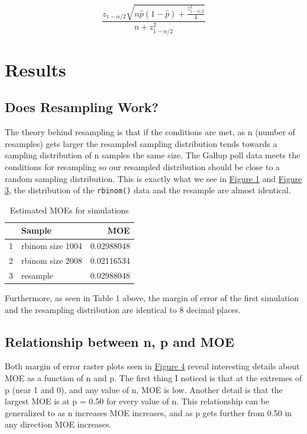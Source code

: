 \documentclass{article}\usepackage[]{graphicx}\usepackage[]{xcolor}
\begin{document}
\begin{multicols}{2}
\[
\frac{z_{1 - \alpha/2} \sqrt{n\hat{p}(1 - \hat{p}) + \frac{z_{1 - \alpha/2}^2}{4}}}{n + z_{1 - \alpha/2}^2}
\]

\section{Results}

\subsection{Does Resampling Work?}

The theory behind resampling is that if the conditions are met, as n (number of resamples) gets larger the resampled sampling distribution tends towards a sampling distribution of n samples the same size. The Gallup poll data meets the conditions for resampling so our resampled distribution should be close to a random sampling distribution. This is exactly what we see in \hyperref[p1]{Figure 1} and \hyperref[p3]{Figure 3}, the distribution of the \texttt{rbinom()} data and the resample are almost identical.

\begin{table}[H]
\centering
\begin{tabular}{rlr}
  \hline
 & Sample & MOE \\ 
  \hline
  1 & rbinom size 1004 & 0.02988048 \\ 
  2 & rbinom size 2008 & 0.02116534 \\ 
  3 & resample & 0.02988048 \\ 
   \hline
\end{tabular}
\caption{Estimated MOEs for simulations}
\end{table}

Furthermore, as seen in Table 1 above, the margin of error of the first simulation and the resampling distribution are identical to 8 decimal places.

\subsection{Relationship between n, p and MOE}

Both margin of error raster plots seen in \hyperref[p4]{Figure 4} reveal interesting details about MOE as a function of n and p. The first thing I noticed is that at the extremes of p (near 1 and 0), and any value of n, MOE is low. Another detail is that the largest MOE is at p = 0.50 for every value of n. This relationship can be generalized to as n increases MOE increases, and as p gets further from 0.50 in any direction MOE increases.


\end{multicols}
\end{document}
